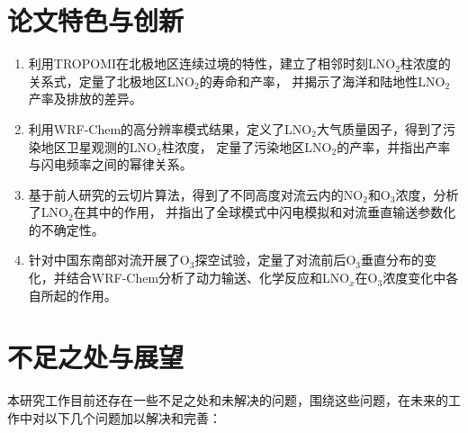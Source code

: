 \section{论文特色与创新}

\begin{enumerate}[label=(\arabic*), labelindent=\parindent, leftmargin=0pt, widest=0, itemindent=*, topsep=0pt, partopsep=0pt, parsep=0pt]

\item 利用TROPOMI在北极地区连续过境的特性，建立了相邻时刻LNO$_2$柱浓度的关系式，定量了北极地区LNO$_2$的寿命和产率，
并揭示了海洋和陆地性LNO$_2$产率及排放的差异。

\item 利用WRF-Chem的高分辨率模式结果，定义了LNO$_2$大气质量因子，得到了污染地区卫星观测的LNO$_2$柱浓度，
定量了污染地区LNO$_2$的产率，并指出产率与闪电频率之间的幂律关系。

\item 基于前人研究的云切片算法，得到了不同高度对流云内的NO$_2$和O$_3$浓度，分析了LNO$_2$在其中的作用，
并指出了全球模式中闪电模拟和对流垂直输送参数化的不确定性。

\item 针对中国东南部对流开展了O$_3$探空试验，定量了对流前后O$_3$垂直分布的变化，并结合WRF-Chem分析了动力输送、化学反应和LNO$_x$在O$_3$浓度变化中各自所起的作用。

\end{enumerate}



\section{不足之处与展望}

本研究工作目前还存在一些不足之处和未解决的问题，围绕这些问题，在未来的工作中对以下几个问题加以解决和完善：

